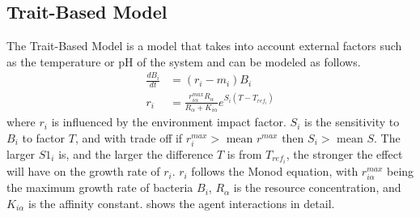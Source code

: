 \subsection{Trait-Based Model}
The Trait-Based Model is a model that takes into account external factors such as the temperature or pH of the system and can be modeled as follows. 
\begin{align*}
    \frac{dB_i}{dt} &= \left(r_i - m_i\right) B_i \\
    r_i &= \frac{r_{i\alpha}^{max}R_\alpha}{R_\alpha + K_{i\alpha}}e^{S_i\left(T-T_{ref_i}\right)}
\end{align*}
where $r_i$ is influenced by the environment impact factor. $S_i$ is the sensitivity to $B_i$ to factor $T$, and with trade off if $r_i^{max} > \text{ mean } r^{max} \text{ then } S_i > \text{ mean } S$. 
The larger $S1_i$ is, and the larger the difference $T$ is from $T_{ref_i}$, the stronger the effect will have on the growth rate of $r_i$. 
$r_i$ follows the Monod equation, with $r_{i\alpha}^{max}$ being the maximum growth rate of bacteria $B_i$, $R_\alpha$ is the resource concentration, and $K_{i\alpha}$ is the affinity constant. 
 shows the agent interactions in detail. 

